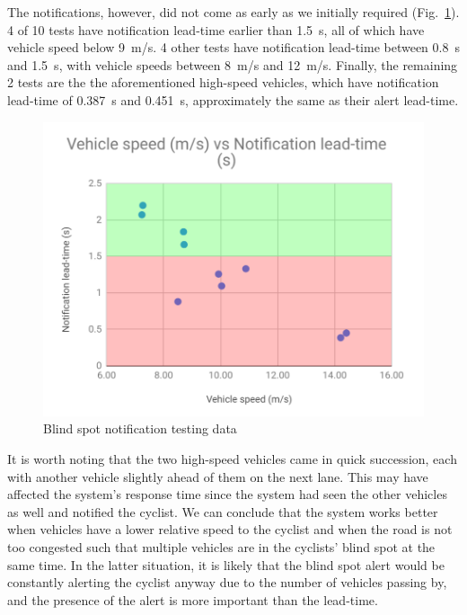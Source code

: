\documentclass[journal]{IEEEtran}
\begin{document}
The notifications, however, did not come as early as we initially required (Fig.~\ref{fig:bs1_vib}). 4 of 10 tests have notification lead-time earlier than \SI{1.5}{\s}, all of which have vehicle speed below \SI{9}{\meter/\s}. 4 other tests have notification lead-time between \SI{0.8}{\s} and \SI{1.5}{\s}, with vehicle speeds between \SI{8}{\meter/\s} and \SI{12}{\meter/\s}. Finally, the remaining 2 tests are the the aforementioned high-speed vehicles, which have notification lead-time of \SI{0.387}{\s} and \SI{0.451}{\s}, approximately the same as their alert lead-time.

\begin{figure}
    \centering
    \includegraphics[width=\columnwidth]{images/BS1_vib.png}
    \caption{Blind spot notification testing data}
    \label{fig:bs1_vib}
\end{figure}

It is worth noting that the two high-speed vehicles came in quick succession, each with another vehicle slightly ahead of them on the next lane. This may have affected the system's response time since the system had seen the other vehicles as well and notified the cyclist. We can conclude that the system works better when vehicles have a lower relative speed to the cyclist and when the road is not too congested such that multiple vehicles are in the cyclists' blind spot at the same time. In the latter situation, it is likely that the blind spot alert would be constantly alerting the cyclist anyway due to the number of vehicles passing by, and the presence of the alert is more important than the lead-time.
\end{document}
